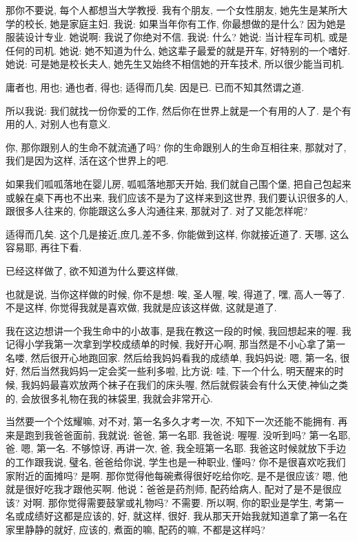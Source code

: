\documentclass[11pt]{article}
\begin{document}
那你不要说, 每个人都想当大学教授. 我有个朋友, 一个女性朋友, 她先生是某所大学的校长, 她是家庭主妇. 我说: 如果当年你有工作, 你最想做的是什么? 因为她是服装设计专业. 她说啊: 我说了你绝对不信. 我说: 什么? 她说: 当计程车司机, 或是任何的司机. 她说: 她不知道为什么, 她这辈子最爱的就是开车, 好特别的一个嗜好. 她说: 可是她是校长夫人, 她先生又始终不相信她的开车技术, 所以很少能当司机.  

\begin{center}
	{\color{green} 庸者也, 用也; 通也者, 得也; 适得而几矣. 因是已. 已而不知其然谓之道.}
\end{center}

\vspace{-0.5cm}

所以我说: 我们就找一份你爱的工作, 然后你在世界上就是一个有用的人了. 是个有用的人, 对别人也有意义. 

你, 那你跟别人的生命不就流通了吗? 你的生命跟别人的生命互相往来, 那就对了, 我们是因为这样, 活在这个世界上的吧.

如果我们呱呱落地在婴儿房, 呱呱落地那天开始, 我们就自己围个堡, 把自己包起来或躲在桌下再也不出来, 我们应该不是为了这样来到这世界, 我们要认识很多的人, 跟很多人往来的, 你能跟这么多人沟通往来, 那就对了. 对了又能怎样呢?


{\color{blue} 适得而几矣.} 这个几是接近,庶几,差不多, 你能做到这样, 你就接近道了. 天哪, 这么容易耶, 再往下看. 



已经这样做了, 欲不知道为什么要这样做, 

也就是说, 当你这样做的时候, 你不是想: 唉, 圣人喔, 唉, 得道了, 嘿, 高人一等了. 不是这样, 你觉得我就是喜欢做, 我就是应该这样做, 这就是道了.

我在这边想讲一个我生命中的小故事, 是我在教这一段的时候, 我回想起来的喔. 我记得小学我第一次拿到学校成绩单的时候, 我好开心啊, 那当然是不小心拿了第一名喽, 然后很开心地跑回家. 然后给我妈妈看我的成绩单, 我妈妈说: 嗯, 第一名, 很好, 然后当然我妈妈一定会奖一些利多啦, 比方说: 哇, 下一个什么, 明天醒来的时候, 我妈妈最喜欢放两个袜子在我们的床头喔, 然后就假装会有什么天使,神仙之类的, 会放很多礼物在我的袜袋里, 我就会非常开心. 

当然要一个个炫耀嘛, 对不对, 第一名多久才考一次, 不知下一次还能不能拥有. 再来是跑到我爸爸面前, 我就说: 爸爸, 第一名耶. 我爸说: 喔喔. 没听到吗? 第一名耶, 爸. 嗯, 第一名. 不够惊讶, 再讲一次, 爸, 我全班第一名耶. 我爸这时候就放下手边的工作跟我说, 璧名, 爸爸给你说, 学生也是一种职业, 懂吗? 你不是很喜欢吃我们家附近的面摊吗? 是啊. 那你觉得他每碗煮得很好吃给你吃, 是不是很应该? 嗯, 他就是很好吃我才跟他买啊. 他说：爸爸是药剂师, 配药给病人, 配对了是不是很应该? 对啊. 那你觉得需要鼓掌或礼物吗? 不需要. 所以啊, 你的职业是学生, 考第一名或成绩好这都是应该的, 好, 就这样, 很好. 我从那天开始我就知道拿了第一名在家里静静的就好, 应该的, 煮面的嘛, 配药的嘛, 不都是这样吗? 
\end{document}
